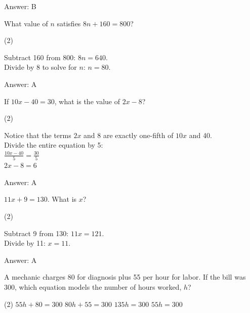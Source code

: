 \documentclass[11pt,paper=a4,answers]{exam}
\begin{document}
\begin{questions}
\begin{solution}
\vspace{20pt}
Answer: \colorbox{yellow!100}{B}
\end{solution}

\question
What value of $n$ satisfies $8n + 160 = 800$?
\begin{tasks}(2)
\end{tasks}

\begin{solution}
Subtract 160 from 800: $8n = 640$. 
\\[10pt]
Divide by 8 to solve for $n$: $n = 80$.

\vspace{20pt}
Answer: \colorbox{yellow!100}{A}
\end{solution}

\question
If $10x - 40 = 30$, what is the value of $2x - 8$?
\begin{tasks}(2)
\end{tasks}

\begin{solution}
Notice that the terms $2x$ and 8 are exactly one-fifth of $10x$ and 40. 
\\[10pt]
Divide the entire equation by 5:
\\[10pt]
$\frac{10x - 40}{5} = \frac{30}{5}$ \\
$2x - 8 = 6$

\vspace{20pt}
Answer: \colorbox{yellow!100}{A}
\end{solution}

\question
$11x + 9 = 130$. What is $x$?
\begin{tasks}(2)
\end{tasks}

\begin{solution}
Subtract 9 from 130: $11x = 121$. 
\\[10pt]
Divide by 11: $x = 11$.

\vspace{20pt}
Answer: \colorbox{yellow!100}{A}
\end{solution}

\question
A mechanic charges 80 for diagnosis plus 55 per hour for labor. If the bill was 300, which equation models the number of hours worked, $h$?
\begin{tasks}(2)
    \task $55h + 80 = 300$
    \task $80h + 55 = 300$
    \task $135h = 300$
    \task $55h = 300$
\end{tasks}


\end{questions}
\end{document}
